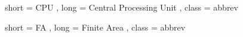 \acuseall
%
%

{
    short = CPU ,
    long  = Central Processing Unit ,
    class = abbrev
}

{
    short = FA ,
    long  = Finite Area ,
    class = abbrev
}
